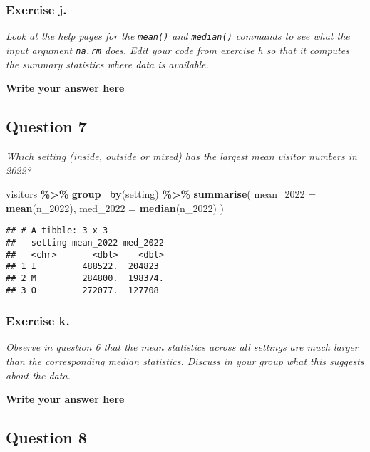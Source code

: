 \documentclass[
]{article}
\newenvironment{Shaded}{\begin{snugshade}}{\end{snugshade}}
\newcommand{\AttributeTok}[1]{\textcolor[rgb]{0.13,0.29,0.53}{#1}}
\newcommand{\FunctionTok}[1]{\textcolor[rgb]{0.13,0.29,0.53}{\textbf{#1}}}
\newcommand{\NormalTok}[1]{#1}
\newcommand{\SpecialCharTok}[1]{\textcolor[rgb]{0.81,0.36,0.00}{\textbf{#1}}}
\begin{document}
\subsubsection{Exercise j.}\label{exercise-j.}

\emph{Look at the help pages for the \texttt{mean()} and
\texttt{median()} commands to see what the input argument \texttt{na.rm}
does. Edit your code from exercise h so that it computes the summary
statistics where data is available.}

\textbf{Write your answer here}

\subsection{Question 7}\label{question-7}

\emph{Which setting (inside, outside or mixed) has the largest mean
visitor numbers in 2022?}

\begin{Shaded}
\begin{Highlighting}[]
\NormalTok{visitors }\SpecialCharTok{\%\textgreater{}\%} 
  \FunctionTok{group\_by}\NormalTok{(setting) }\SpecialCharTok{\%\textgreater{}\%}
  \FunctionTok{summarise}\NormalTok{(}
    \AttributeTok{mean\_2022 =} \FunctionTok{mean}\NormalTok{(n\_2022),}
    \AttributeTok{med\_2022 =} \FunctionTok{median}\NormalTok{(n\_2022)}
\NormalTok{  )}
\end{Highlighting}
\end{Shaded}

\begin{verbatim}
## # A tibble: 3 x 3
##   setting mean_2022 med_2022
##   <chr>       <dbl>    <dbl>
## 1 I         488522.  204823 
## 2 M         284800.  198374.
## 3 O         272077.  127708
\end{verbatim}

\subsubsection{Exercise k.}\label{exercise-k.}

\emph{Observe in question 6 that the mean statistics across all settings
are much larger than the corresponding median statistics. Discuss in
your group what this suggests about the data.}

\textbf{Write your answer here}

\subsection{Question 8}\label{question-8}
\end{document}
